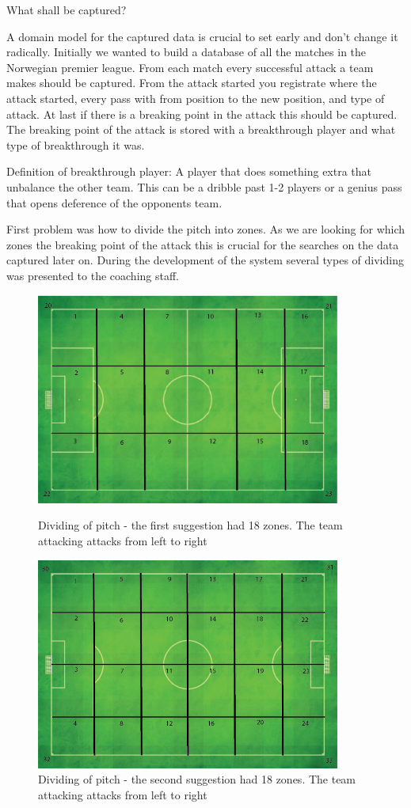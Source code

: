 What shall be captured? 



A domain model for the captured data is crucial to set early and don't change it radically. Initially we wanted to build a database of all the matches in the Norwegian premier league. From each match every successful attack a team makes should be captured. From the attack started you registrate where the attack started, every pass with from position to the new position, and type of attack. At last if there is a breaking point in the attack this should be captured. The breaking point of the attack is stored with a breakthrough player and what type of breakthrough it was.

Definition of breakthrough player: A player that does something extra that unbalance the other team. This can be a dribble past 1-2 players or a genius pass that opens deference of the opponents team. 

First problem was how to divide the pitch into zones. As we are looking for which zones the breaking point of the attack this is crucial for the searches on the data captured later on. During the development of the system several types of dividing was presented to the coaching staff. 

\begin{figure}[ht!]
\centering
\includegraphics[width=100mm]{images/general/first_zones.png}
\caption{Dividing of pitch - the first suggestion had 18 zones. The team attacking attacks from left to right}
\includegraphics[width=100mm]{images/general/second_zones.png}
\caption{Dividing of pitch - the second suggestion had 18 zones. The team attacking attacks from left to right}
\label{overflow}
\end{figure}
